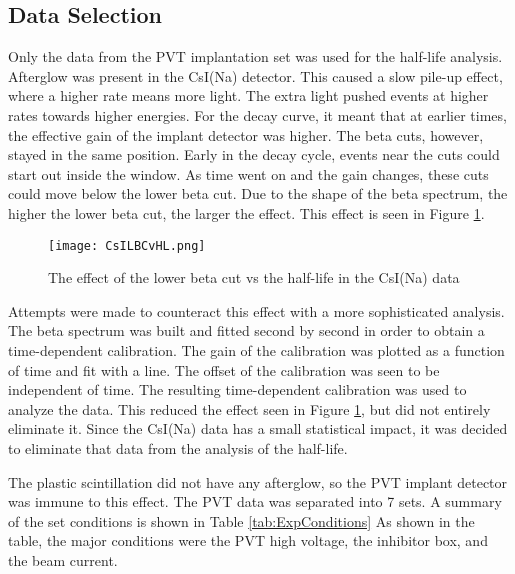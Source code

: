 \subsection{Data Selection}
Only the data from the PVT implantation set was used for the half-life analysis.
Afterglow was present in the CsI(Na) detector.
This caused a slow pile-up effect, where a higher rate means more light.
The extra light pushed events at higher rates towards higher energies.
For the decay curve, it meant that at earlier times, the effective gain of the implant detector was higher.
The beta cuts, however, stayed in the same position.
Early in the decay cycle, events near the cuts could start out inside the window.
As time went on and the gain changes, these cuts could move below the lower beta cut. 
Due to the shape of the beta spectrum, the higher the lower beta cut, the larger the effect.
This effect is seen in Figure \ref{fig:LBCvHL}.

\begin{figure}[!htb]
	\centerline{\texttt{[image: CsILBCvHL.png]}}
	\caption{The effect of the lower beta cut vs the half-life in the CsI(Na) data}
	\label{fig:LBCvHL}
\end{figure}

Attempts were made to counteract this effect with a more sophisticated analysis.
The beta spectrum was built and fitted second by second in order to obtain a time-dependent calibration.
The gain of the calibration was plotted as a function of time and fit with a line.
The offset of the calibration was seen to be independent of time.
The resulting time-dependent calibration was used to analyze the data.
This reduced the effect seen in Figure \ref{fig:LBCvHL}, but did not entirely eliminate it.
Since the CsI(Na) data has a small statistical impact, it was decided to eliminate that data from the analysis of the half-life.

The plastic scintillation did not have any afterglow, so the PVT implant detector was immune to this effect. 
The PVT data was separated into 7 sets.
A summary of the set conditions is shown in Table \ref{tab:ExpConditions}
As shown in the table, the major conditions were the PVT high voltage, the inhibitor box, and the beam current. 

